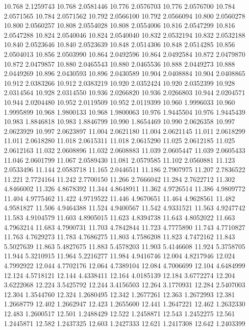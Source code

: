 10.768 2.1259743
10.768 2.0581446
10.776 2.0576703
10.776 2.0576700
10.784 2.0571565
10.784 2.0571562
10.792 2.0566100
10.792 2.0566094
10.800 2.0560278
10.800 2.0560257
10.808 2.0554028
10.808 2.0554006
10.816 2.0547299
10.816 2.0547288
10.824 2.0540046
10.824 2.0540040
10.832 2.0532194
10.832 2.0532188
10.840 2.0523646
10.840 2.0523639
10.848 2.0514306
10.848 2.0514285
10.856 2.0504013
10.856 2.0503990
10.864 2.0492596
10.864 2.0492584
10.872 2.0479870
10.872 2.0479857
10.880 2.0465543
10.880 2.0465536
10.888 2.0449273
10.888 2.0449269
10.896 2.0430593
10.896 2.0430589
10.904 2.0408884
10.904 2.0408865
10.912 2.0383266
10.912 2.0383219
10.920 2.0352424
10.920 2.0352399
10.928 2.0314564
10.928 2.0314550
10.936 2.0266820
10.936 2.0266803
10.944 2.0204571
10.944 2.0204480
10.952 2.0119509
10.952 2.0119399
10.960 1.9996033
10.960 1.9995899
10.968 1.9800133
10.968 1.9800063
10.976 1.9445504
10.976 1.9445439
10.983 1.8846818
10.983 1.8846799
10.990 1.8654469
10.990 2.0626358
10.997 2.0623929
10.997 2.0623897
11.004 2.0621180
11.004 2.0621145
11.011 2.0618299
11.011 2.0618280
11.018 2.0615311
11.018 2.0615290
11.025 2.0612185
11.025 2.0612163
11.032 2.0608896
11.032 2.0608883
11.039 2.0605447
11.039 2.0605433
11.046 2.0601799
11.067 2.0589430
11.081 2.0579585
11.102 2.0560881
11.123 2.0533496
11.144 2.0583718
11.165 2.0446511
11.186 2.7907975
11.207 2.7836522
11.221 2.7724164
11.242 2.7700150
11.266 2.7666042
11.284 2.7622712
11.302 4.8466002
11.326 4.8678392
11.344 4.8648911
11.362 4.9726514
11.386 4.9809772
11.404 4.9775462
11.422 4.9719522
11.446 4.9670651
11.464 4.9628561
11.482 4.9581827
11.506 4.9464388
11.524 4.9400567
11.542 4.9331521
11.563 4.9247742
11.583 4.9104579
11.603 4.8905015
11.623 4.8394738
11.643 4.8052022
11.663 4.7963214
11.683 4.7900731
11.703 4.7842844
11.723 4.7775890
11.743 4.7710827
11.763 4.7629273
11.783 4.7686275
11.803 4.7586208
11.823 4.7472162
11.843 5.5027639
11.863 5.4827675
11.883 5.4578203
11.903 5.4146608
11.924 5.3758705
11.944 5.3210915
11.964 5.2216277
11.984 4.9416746
12.004 4.8217946
12.024 4.7992922
12.044 4.7702176
12.064 4.7389104
12.084 4.7006699
12.104 4.6484999
12.124 4.5718121
12.144 4.4338411
12.164 4.0185139
12.184 3.6772274
12.204 3.6222068
12.224 3.5425792
12.244 3.4156503
12.264 3.1770931
12.284 2.5407003
12.304 1.3544760
12.324 1.2680495
12.342 1.2677261
12.363 1.2672993
12.381 1.2668779
12.402 1.2662947
12.423 1.2655600
12.441 1.2647221
12.462 1.2632330
12.483 1.2600517
12.501 1.2488429
12.522 1.2458871
12.543 1.2452275
12.561 1.2445871
12.582 1.2437325
12.603 1.2427333
12.621 1.2417308
12.642 1.2403399
